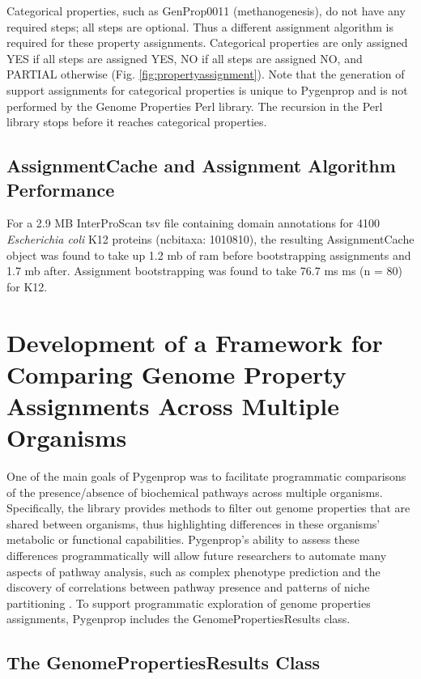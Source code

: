 Categorical properties, such as GenProp0011 (methanogenesis), do not have any 
required steps; all steps are optional. Thus a different assignment algorithm is 
required for these property assignments. Categorical properties are only 
assigned YES if all steps are assigned YES, NO if all steps are assigned NO, and 
PARTIAL otherwise (Fig. \ref{fig:propertyassignment}). Note that the generation 
of support assignments for categorical properties is unique to Pygenprop and is 
not performed by the Genome Properties Perl library. The recursion in the Perl 
library stops before it reaches categorical properties.

\subsection{AssignmentCache and Assignment Algorithm Performance} 
\label{AssignmentCache-Performance}

For a 2.9 MB InterProScan \gls{tsv} file containing domain annotations for 4100 
\textit{Escherichia coli} K12 proteins (\gls{ncbitaxa}: 1010810), the resulting 
AssignmentCache object was found to take up 1.2 \gls{mb} of \gls{ram} before 
bootstrapping assignments and 1.7 \gls{mb} after. Assignment bootstrapping was 
found to take 76.7 ms  ms (\gls{n} = 80) for K12.

\section{Development of a Framework for Comparing Genome Property Assignments 
Across Multiple Organisms} \label{GenomePropertiesResults}

One of the main goals of Pygenprop was to facilitate programmatic comparisons of 
the presence/absence of biochemical pathways across multiple organisms. 
Specifically, the library provides methods to filter out genome properties that are 
shared between organisms, thus highlighting differences in these organisms' 
metabolic or functional capabilities. Pygenprop's ability to assess these 
differences programmatically will allow future researchers to automate many 
aspects of pathway analysis, such as complex phenotype prediction and the 
discovery of correlations between pathway presence and patterns of niche 
partitioning \cite{finke2008niche}. To support programmatic exploration of 
genome properties assignments, Pygenprop includes the GenomePropertiesResults 
class. 

\subsection{The GenomePropertiesResults Class}

